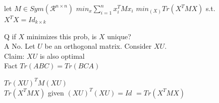 {	
	
	\begin{exercise}
		let $M \in Sym(\mathcal R^{n \times n})$
		$min_{x} \sum_{i=1}^{n} x_i^T M x_i$ $min_(X) Tr(X^T M X)$ s.t. $X^TX = Id_{k\times k}$ 
		
		Q if $X$ minimizes this prob, is $X$ unique?\\
		A No. Let $U$ be an orthogonal matrix.  Consider $XU$. \\
		Claim: $XU$ is also optimal\\
		
		Fact $Tr(ABC) = Tr(BCA)$ \\
		
		\begin{center}
			$Tr(XU)^T M (XU)$\\
			$ Tr(X^T M X)$ given $(XU)^T(XU) = Id$
			$=Tr(X^TMX)$
		\end{center}
		
	\end{exercise}
}

